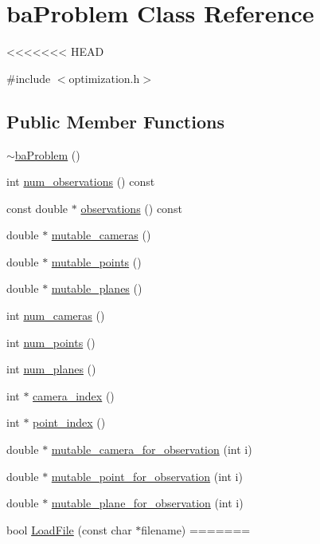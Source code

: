 \hypertarget{classbaProblem}{\section{ba\-Problem Class Reference}
\label{d0/d13/classbaProblem}
}
<<<<<<< HEAD


{\ttfamily \#include $<$optimization.\-h$>$}

\subsection*{Public Member Functions}
\begin{DoxyCompactItemize}
\item 
\hyperlink{classbaProblem_a8fc465a9e9245a125ae6867881428811}{$\sim$ba\-Problem} ()
\item 
int \hyperlink{classbaProblem_a7c58929484cf2b00ed3549d9bf344ecc}{num\-\_\-observations} () const 
\item 
const double $\ast$ \hyperlink{classbaProblem_a3cdc19362c8fca6eda57757da2041062}{observations} () const 
\item 
double $\ast$ \hyperlink{classbaProblem_ac85772625fb48c5c8ee6c16e91cf104d}{mutable\-\_\-cameras} ()
\item 
double $\ast$ \hyperlink{classbaProblem_ac1010047fee15558fddfeadd2cecf27d}{mutable\-\_\-points} ()
\item 
double $\ast$ \hyperlink{classbaProblem_adb7fdfcbd20d9f008bc6396bae264a70}{mutable\-\_\-planes} ()
\item 
int \hyperlink{classbaProblem_ae22aaf7bf698f0a0feea98f870fd9208}{num\-\_\-cameras} ()
\item 
int \hyperlink{classbaProblem_a9e5a516d78d2f91ac47cc9aa7a805f57}{num\-\_\-points} ()
\item 
int \hyperlink{classbaProblem_a519b1cf504b357a558d20324331e2d2b}{num\-\_\-planes} ()
\item 
int $\ast$ \hyperlink{classbaProblem_a77c73af5dc63e58f9dcb1d6879e21e2c}{camera\-\_\-index} ()
\item 
int $\ast$ \hyperlink{classbaProblem_a0dfa9d310b92564faee6c5a98a555f17}{point\-\_\-index} ()
\item 
double $\ast$ \hyperlink{classbaProblem_ae072d06b4cb8d1ff880b5f8ee97667e5}{mutable\-\_\-camera\-\_\-for\-\_\-observation} (int i)
\item 
double $\ast$ \hyperlink{classbaProblem_a6ef11eeda5c963bea9afeb2bf22b503a}{mutable\-\_\-point\-\_\-for\-\_\-observation} (int i)
\item 
double $\ast$ \hyperlink{classbaProblem_ae4efd07e572bd96065b3a31981eaf3db}{mutable\-\_\-plane\-\_\-for\-\_\-observation} (int i)
\item 
bool \hyperlink{classbaProblem_afaf36ca131fac1f80dbb5d077d92356c}{Load\-File} (const char $\ast$filename)
=======

\end{DoxyCompactItemize}
